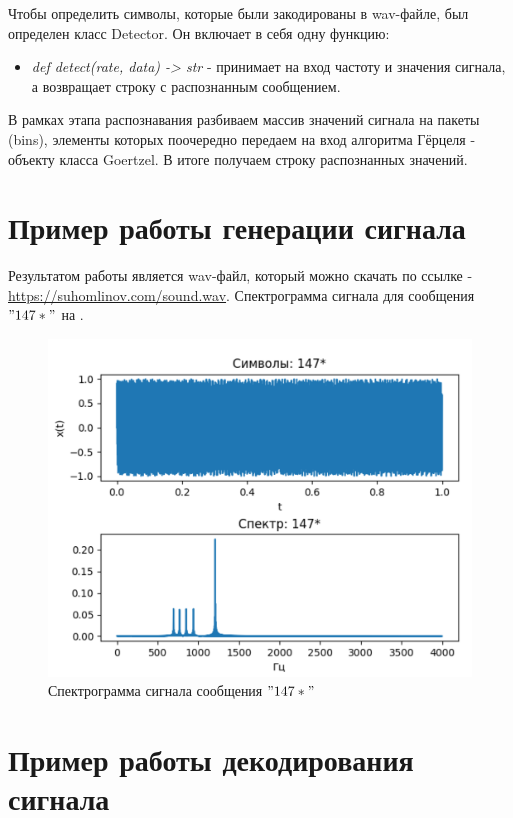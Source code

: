 Чтобы определить символы, которые были закодированы в wav-файле, был определен класс Detector. Он включает в себя одну функцию:

\begin{itemize}
	\item \textit{def detect(rate, data) -> str} - принимает на вход частоту и значения сигнала, а возвращает строку с распознанным сообщением.
\end{itemize}

В рамках этапа распознавания разбиваем массив значений сигнала на пакеты (bins), элементы которых поочередно передаем на вход алгоритма Гёрцеля - объекту класса Goertzel. В итоге получаем строку распознанных значений.

\section{Пример работы генерации сигнала}

Результатом работы является wav-файл, который можно скачать по ссылке - \href{https://suhomlinov.com/sound.wav}{https://suhomlinov.com/sound.wav}. Спектрограмма сигнала для сообщения $"147*"$ на .

\begin{figure}[ht] 
	\center
	\includegraphics [scale=0.7] {my_folder/images/step-9}
	\caption{Спектрограмма сигнала сообщения $"147*"$} 
	\label{fig:step-9}
	\end{figure}

\section{Пример работы декодирования сигнала}

